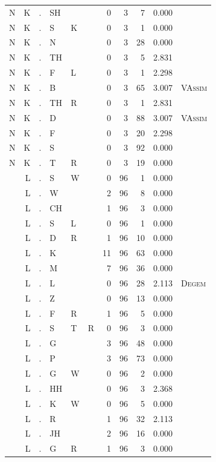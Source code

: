 \documentclass[12pt]{article}
\begin{document}
\begin{longtable}{r@{ } r@{ } c@{ } l@{ } l@{ } l@{ } r r r r l }
N & K & . & SH &  &  & 0 & 3 & 7 & 0.000 &  \\
N & K & . & S & K &  & 0 & 3 & 1 & 0.000 &  \\
N & K & . & N &  &  & 0 & 3 & 28 & 0.000 &  \\
N & K & . & TH &  &  & 0 & 3 & 5 & 2.831 &  \\
N & K & . & F & L &  & 0 & 3 & 1 & 2.298 &  \\
N & K & . & B &  &  & 0 & 3 & 65 & 3.007 & \textsc{VAssim} \\
N & K & . & TH & R &  & 0 & 3 & 1 & 2.831 &  \\
N & K & . & D &  &  & 0 & 3 & 88 & 3.007 & \textsc{VAssim} \\
N & K & . & F &  &  & 0 & 3 & 20 & 2.298 &  \\
N & K & . & S &  &  & 0 & 3 & 92 & 0.000 &  \\
N & K & . & T & R &  & 0 & 3 & 19 & 0.000 &  \\
 & L & . & S & W &  & 0 & 96 & 1 & 0.000 &  \\
 & L & . & W &  &  & 2 & 96 & 8 & 0.000 &  \\
 & L & . & CH &  &  & 1 & 96 & 3 & 0.000 &  \\
 & L & . & S & L &  & 0 & 96 & 1 & 0.000 &  \\
 & L & . & D & R &  & 1 & 96 & 10 & 0.000 &  \\
 & L & . & K &  &  & 11 & 96 & 63 & 0.000 &  \\
 & L & . & M &  &  & 7 & 96 & 36 & 0.000 &  \\
 & L & . & L &  &  & 0 & 96 & 28 & 2.113 & \textsc{Degem} \\
 & L & . & Z &  &  & 0 & 96 & 13 & 0.000 &  \\
 & L & . & F & R &  & 1 & 96 & 5 & 0.000 &  \\
 & L & . & S & T & R & 0 & 96 & 3 & 0.000 &  \\
 & L & . & G &  &  & 3 & 96 & 48 & 0.000 &  \\
 & L & . & P &  &  & 3 & 96 & 73 & 0.000 &  \\
 & L & . & G & W &  & 0 & 96 & 2 & 0.000 &  \\
 & L & . & HH &  &  & 0 & 96 & 3 & 2.368 &  \\
 & L & . & K & W &  & 0 & 96 & 5 & 0.000 &  \\
 & L & . & R &  &  & 1 & 96 & 32 & 2.113 &  \\
 & L & . & JH &  &  & 2 & 96 & 16 & 0.000 &  \\
 & L & . & G & R &  & 1 & 96 & 3 & 0.000 &  \\

\end{longtable}
\end{document}
